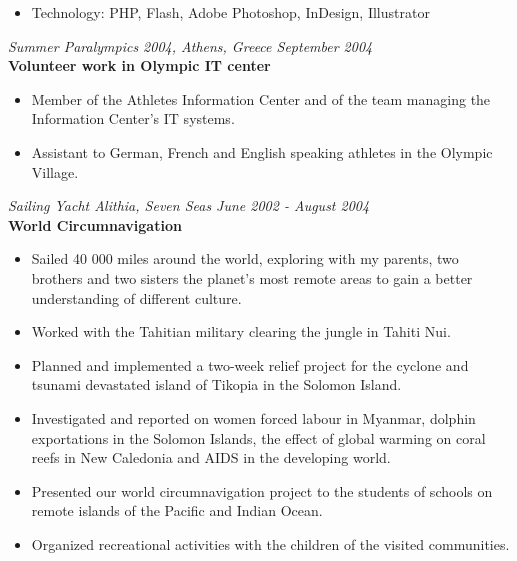\documentclass[margin]{res}
\begin{document}
\begin{resume}
\begin{itemize}
  \item Technology: PHP, Flash, Adobe Photoshop, InDesign, Illustrator
  \end{itemize}
  {\it Summer Paralympics 2004, Athens, Greece \hfill September 2004} \\
  {\bf Volunteer work in Olympic IT center}
  \begin{itemize} \itemsep -0.5pt
  \item Member of the Athletes Information Center and of the team managing the Information Center’s IT systems.
  \item Assistant to German, French and English speaking athletes in the Olympic Village.
  \end{itemize}
  {\it Sailing Yacht Alithia, Seven Seas \hfill June 2002 - August 2004} \\
  {\bf World Circumnavigation}
  \begin{itemize} \itemsep -0.5pt
  \item Sailed 40 000 miles around the world, exploring with my parents, two brothers and two sisters the planet’s most remote areas to gain a better understanding of different culture.
  \item Worked with the Tahitian military clearing the jungle in Tahiti Nui.
  \item Planned and implemented a two-week relief project for the cyclone and tsunami devastated island of Tikopia in the Solomon Island.
  \item Investigated and reported on women forced labour in Myanmar, dolphin exportations in the Solomon Islands, the effect of global warming on coral reefs in New Caledonia and AIDS in the developing world.
  \item Presented our world circumnavigation project to the students of schools on remote islands of the Pacific and Indian Ocean.
  \item Organized recreational activities with the children of the visited communities.
  \end{itemize}


\end{resume}
\end{document}

